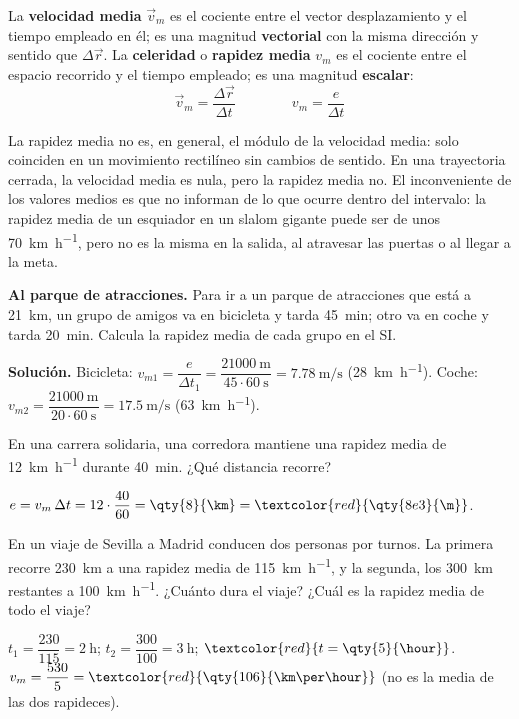 \begin{definition}
    La \textbf{velocidad media} \(\vec v_m\) es el cociente entre el vector desplazamiento y el tiempo empleado en él; es una
    magnitud \textbf{vectorial} con la misma dirección y sentido que \(\Delta\vec r\). La \textbf{celeridad} o \textbf{rapidez
    media} \(v_m\) es el cociente entre el espacio recorrido y el tiempo empleado; es una magnitud \textbf{escalar}:
    \[ \vec v_m = \frac{\Delta\vec r}{\Delta t} \qquad\qquad v_m = \frac{e}{\Delta t} \]
\end{definition}

La rapidez media no es, en general, el módulo de la velocidad media: solo coinciden en un movimiento rectilíneo sin cambios de
sentido. En una trayectoria cerrada, la velocidad media es nula, pero la rapidez media no. El inconveniente de los valores medios es
que no informan de lo que ocurre dentro del intervalo: la rapidez media de un esquiador en un slalom gigante puede ser de unos
\qty{70}{\km\per\hour}, pero no es la misma en la salida, al atravesar las puertas o al llegar a la meta.

\begin{example}
    \textbf{Al parque de atracciones.} Para ir a un parque de atracciones que está a \qty{21}{\km}, un grupo de amigos va en
    bicicleta y tarda \qty{45}{\minute}; otro va en coche y tarda \qty{20}{\minute}. Calcula la rapidez media de cada grupo en el SI.

    \textbf{Solución.} Bicicleta: \(v_{m1} = \dfrac{e}{\Delta t_1} = \dfrac{\qty{21000}{\m}}{45 \cdot \qty{60}{\s}} = \qty{7.78}{\m\per\s}\)
    (\qty{28}{\km\per\hour}). Coche: \(v_{m2} = \dfrac{\qty{21000}{\m}}{20 \cdot \qty{60}{\s}} = \qty{17.5}{\m\per\s}\)
    (\qty{63}{\km\per\hour}).
\end{example}

\begin{exercise}
    En una carrera solidaria, una corredora mantiene una rapidez media de \qty{12}{\km\per\hour} durante \qty{40}{\minute}.
    ¿Qué distancia recorre?
    \begin{solu}
        \(e = v_m\,\Delta t = 12 \cdot \dfrac{40}{60} = \qty{8}{\km} = \textcolor{red}{\qty{8e3}{\m}}\).
    \end{solu}
\end{exercise}

\begin{exercise}
    En un viaje de Sevilla a Madrid conducen dos personas por turnos. La primera recorre \qty{230}{\km} a una rapidez media de
    \qty{115}{\km\per\hour}, y la segunda, los \qty{300}{\km} restantes a \qty{100}{\km\per\hour}. ¿Cuánto dura el viaje? ¿Cuál es
    la rapidez media de todo el viaje?
    \begin{solu}
        \(t_1 = \dfrac{230}{115} = \qty{2}{\hour}\); \(t_2 = \dfrac{300}{100} = \qty{3}{\hour}\); \(\textcolor{red}{t = \qty{5}{\hour}}\).
        \(v_m = \dfrac{530}{5} = \textcolor{red}{\qty{106}{\km\per\hour}}\) (no es la media de las dos rapideces).
    \end{solu}
\end{exercise}

